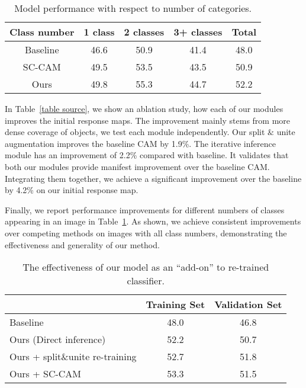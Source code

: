 \documentclass[10pt,twocolumn,letterpaper]{article}
\begin{document}
\begin{table}[]
\centering
\footnotesize
\begin{tabular}{c|cccc}
\hline
     Class number & 1 class & 2 classes & 3+ classes & Total \\ \hline
Baseline &  46.6 & 50.9 & 41.4 & 48.0  \\ 
SC-CAM\cite{chang2020weakly} &  49.5 & 53.5 & 43.5 & 50.9 \\ 
Ours & 49.8 & 55.3 & 44.7 &52.2       \\ \hline
\end{tabular}
\caption{Model performance with respect to number of categories.
}
\vspace{-2mm}
\label{table per class cam}
\end{table}

In Table~\ref{table source}, we show an ablation study, how each of our modules improves the initial response maps.
The improvement mainly stems from more dense coverage of objects, we test each module independently. 
Our split $\&$ unite augmentation improves the baseline CAM by 1.9\%. 
The iterative inference module has an improvement of 2.2\% compared with baseline.
It validates that both our modules provide manifest improvement over the baseline CAM.  Integrating them together, we achieve a significant improvement over the baseline by 4.2\% on our initial response map.  

Finally, 
we report performance improvements for different numbers of classes appearing in an image in Table~\ref{table per class cam}.
As shown, we achieve consistent improvements over competing methods on images with all class numbers,  demonstrating the effectiveness and generality of our method. 






\begin{table}[]
\footnotesize
\centering
\begin{tabular}{l|c|c}
\hline
         & Training Set & Validation Set \\ \hline
Baseline & 48.0         & 46.8           \\
Ours (Direct inference)  & 52.2         & 50.7           \\
Ours + split\&unite re-training  & 52.7         & 51.8             \\
Ours + SC-CAM\cite{chang2020weakly}  & 53.3         & 51.5             \\
\hline
\end{tabular}
\caption{The effectiveness of our model as an \enquote{add-on} to
re-trained classifier.
}
\vspace{-5mm}
\label{table retrain}
\end{table}
\end{document}
